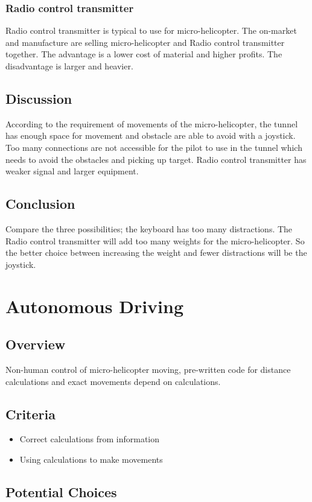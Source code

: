 \documentclass[letterpaper, 10, draftclsnofoot, onecolumn]{IEEEtran}
\begin{document}
\subsubsection*{Radio control transmitter}\hfill \break 
Radio control transmitter is typical to use for micro-helicopter. The on-market and manufacture are selling micro-helicopter and Radio control transmitter together. The advantage is a lower cost of material and higher profits. The disadvantage is larger and heavier. 
\subsection*{Discussion}\hfill \break
According to the requirement of movements of the micro-helicopter, the tunnel has enough space for movement and obstacle are able to avoid with a joystick. Too many connections are not accessible for the pilot to use in the tunnel which needs to avoid the obstacles and picking up target. Radio control transmitter has weaker signal and larger equipment. 
\subsection*{Conclusion}\hfill \break
Compare the three possibilities; the keyboard has too many distractions. The Radio control transmitter will add too many weights for the micro-helicopter. So the better choice between increasing the weight and fewer distractions will be the joystick.

\section*{Autonomous Driving}
\subsection*{Overview}
Non-human control of micro-helicopter moving, pre-written code for distance calculations and exact movements depend on calculations. 
\subsection*{Criteria}
\begin{itemize}
\item Correct calculations from information
\item Using calculations to make movements 
\end{itemize}
\subsection*{Potential Choices}
\end{document}
